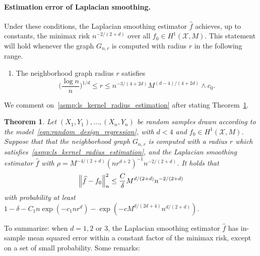 \documentclass[twoside]{article}
\newcommand{\1}{\mathbf{1}}
\newcommand{\Xset}{\mathcal{X}}
\newcommand{\wh}[1]{\widehat{#1}}
\newtheorem{theorem}{Theorem}
\theoremstyle{definition}
\theoremstyle{remark}
\begin{document}
\paragraph{Estimation error of Laplacian smoothing.} 
Under these conditions, the Laplacian smoothing estimator $\wh{f}$ achieves, up to constants, the minimax risk $n^{-2/(2 + d)}$ over all $f_0 \in H^1(\Xset,M)$. This statement will hold whenever the graph $G_{n,r}$ is computed with radius $r$ in the following range.
\begin{enumerate}[label=(R\arabic*)]
	\setcounter{enumi}{0}
	\item 
	\label{asmp:ls_kernel_radius_estimation}
	The neighborhood graph radius $r$ satisfies
	\begin{equation*}
	\biggl(\frac{\log n}{n}\biggr)^{1/d} \leq r \leq n^{-3/(4 + 2d)} M^{(d - 4)/(4 + 2d)} \wedge c_0.
	\end{equation*}
\end{enumerate}
We comment on~\ref{asmp:ls_kernel_radius_estimation} after stating Theorem~\ref{thm:laplacian_smoothing_estimation1}.
\begin{theorem}
	\label{thm:laplacian_smoothing_estimation1}
	Let $(X_1,Y_1),\ldots,(X_n,Y_n)$ be random samples drawn according to the model~\eqref{eqn:random_design_regression}, with $d < 4$ and $f_0 \in H^1(\Xset,M)$. Suppose that that the neighborhood graph $G_{n,r}$ is computed with a radius $r$ which satisfies~\ref{asmp:ls_kernel_radius_estimation},  and the Laplacian smoothing estimator $\wh{f}$ with $\rho = M^{-4/(2 + d)} (nr^{d + 2})^{-1} n^{-2/(2 + d)}$. It holds that
	\begin{equation*}
	\Bigl\|\wh{f} - f_0\Bigr\|_n^2 \leq \frac{C}{\delta} M^{d/(2 + d)} n^{-2/(2 + d)}
	\end{equation*}
	with probability at least $1 - \delta -  C_1n\exp(-c_1nr^d) - \exp(-c M^{d/(2d + 4)} n^{d/(2+d)})$.
\end{theorem}
To summarize: when $d = 1,2$ or $3$, the Laplacian smoothing estimator $\wh{f}$ has in-sample mean squared error within a constant factor of the minimax risk, except on a set of small probability. Some remarks:
\end{document}

